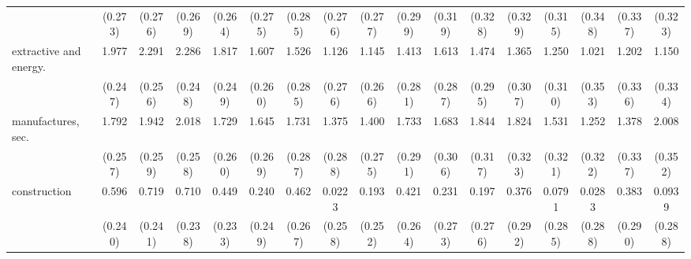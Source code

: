 {\begin{tabular}{l*{16}{c}}
                    &     (0.273)         &     (0.276)         &     (0.269)         &     (0.264)         &     (0.275)         &     (0.285)         &     (0.276)         &     (0.277)         &     (0.299)         &     (0.319)         &     (0.328)         &     (0.329)         &     (0.315)         &     (0.348)         &     (0.337)         &     (0.323)         \\
[1em]
extractive and energy.&       1.977\sym{***}&       2.291\sym{***}&       2.286\sym{***}&       1.817\sym{***}&       1.607\sym{***}&       1.526\sym{***}&       1.126\sym{***}&       1.145\sym{***}&       1.413\sym{***}&       1.613\sym{***}&       1.474\sym{***}&       1.365\sym{***}&       1.250\sym{***}&       1.021\sym{**} &       1.202\sym{***}&       1.150\sym{***}\\
                    &     (0.247)         &     (0.256)         &     (0.248)         &     (0.249)         &     (0.260)         &     (0.285)         &     (0.276)         &     (0.266)         &     (0.281)         &     (0.287)         &     (0.295)         &     (0.307)         &     (0.310)         &     (0.353)         &     (0.336)         &     (0.334)         \\
[1em]
manufactures, sec.  &       1.792\sym{***}&       1.942\sym{***}&       2.018\sym{***}&       1.729\sym{***}&       1.645\sym{***}&       1.731\sym{***}&       1.375\sym{***}&       1.400\sym{***}&       1.733\sym{***}&       1.683\sym{***}&       1.844\sym{***}&       1.824\sym{***}&       1.531\sym{***}&       1.252\sym{***}&       1.378\sym{***}&       2.008\sym{***}\\
                    &     (0.257)         &     (0.259)         &     (0.258)         &     (0.260)         &     (0.269)         &     (0.287)         &     (0.288)         &     (0.275)         &     (0.291)         &     (0.306)         &     (0.317)         &     (0.323)         &     (0.321)         &     (0.322)         &     (0.337)         &     (0.352)         \\
[1em]
construction        &       0.596\sym{*}  &       0.719\sym{**} &       0.710\sym{**} &       0.449         &       0.240         &       0.462         &      0.0223         &       0.193         &       0.421         &       0.231         &       0.197         &       0.376         &      0.0791         &      0.0283         &       0.383         &      0.0939         \\
                    &     (0.240)         &     (0.241)         &     (0.238)         &     (0.233)         &     (0.249)         &     (0.267)         &     (0.258)         &     (0.252)         &     (0.264)         &     (0.273)         &     (0.276)         &     (0.292)         &     (0.285)         &     (0.288)         &     (0.290)         &     (0.288)         \\

\end{tabular}}
